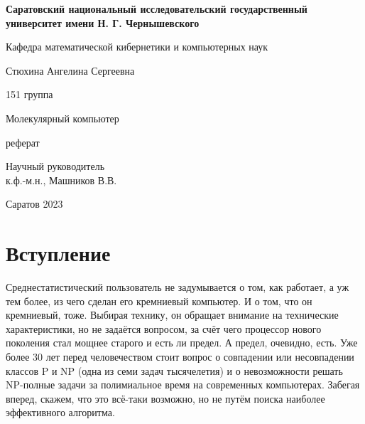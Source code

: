 \documentclass[titlepage, 12pt]{article}
\begin{document}
\begin{titlepage}
    \newpage
    \begin{center}
    {\bfseries Саратовский национальный исследовательский государственный университет имени Н. Г. Чернышевского}
    \vspace{1cm}
    
    Кафедра математической кибернетики и компьютерных наук
    \vspace{6em}
    
    Стюхина Ангелина Сергеевна
     
     151 группа
    \end{center}

    \vspace{1.2em}

    \begin{center}
    \Large Молекулярный компьютер
    \end{center}

    \vspace{5em}

    \begin{center}
     реферат
     \end{center}
    \vspace{6em}

    \begin{center}
    Научный руководитель \\
    \>к.ф.-м.н., Машников В.В.\\
    \end{center}


    \vspace{\fill}

    \begin{center}
   Саратов 2023
    \end{center}

    \end{titlepage}

\setcounter{page}{2}
\tableofcontents
\newpage

\section*{Вступление}
Среднестатистический пользователь не задумывается о том, как работает, а уж тем более, из чего сделан его кремниевый компьютер. И о том, что он кремниевый, тоже. Выбирая технику, он обращает внимание на технические характеристики, но не задаётся вопросом, за счёт чего процессор нового поколения стал мощнее старого и есть ли предел. А предел, очевидно, есть. Уже более 30 лет перед человечеством стоит вопрос о совпадении или несовпадении классов P и NP (одна из семи задач тысячелетия) и о невозможности решать NP-полные задачи за полимиальное время на современных компьютерах. Забегая вперед, скажем, что это всё-таки возможно, но не путём поиска наиболее эффективного алгоритма.
\end{document}
